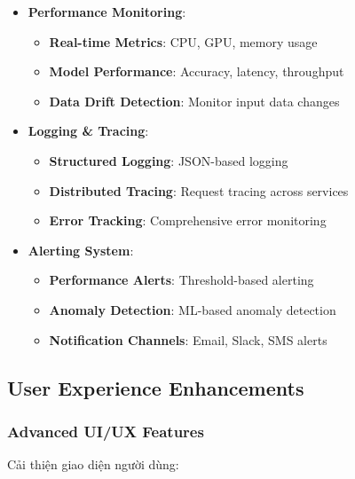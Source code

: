 \begin{itemize}
    \item \textbf{Performance Monitoring}:
    \begin{itemize}
        \item \textbf{Real-time Metrics}: CPU, GPU, memory usage
        \item \textbf{Model Performance}: Accuracy, latency, throughput
        \item \textbf{Data Drift Detection}: Monitor input data changes
    \end{itemize}
    
    \item \textbf{Logging \& Tracing}:
    \begin{itemize}
        \item \textbf{Structured Logging}: JSON-based logging
        \item \textbf{Distributed Tracing}: Request tracing across services
        \item \textbf{Error Tracking}: Comprehensive error monitoring
    \end{itemize}
    
    \item \textbf{Alerting System}:
    \begin{itemize}
        \item \textbf{Performance Alerts}: Threshold-based alerting
        \item \textbf{Anomaly Detection}: ML-based anomaly detection
        \item \textbf{Notification Channels}: Email, Slack, SMS alerts
    \end{itemize}
\end{itemize}

\subsection{User Experience Enhancements}

\subsubsection{Advanced UI/UX Features}

Cải thiện giao diện người dùng:

